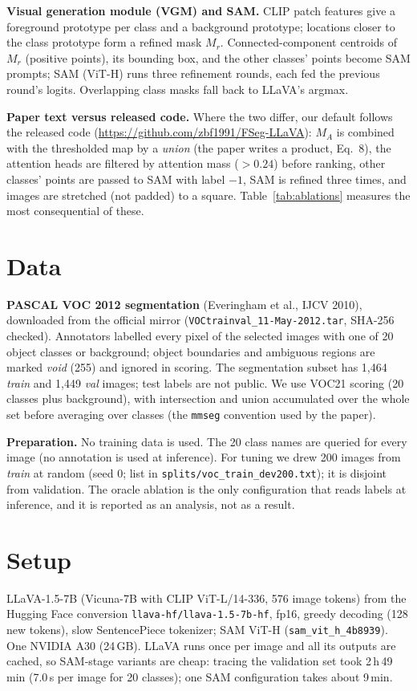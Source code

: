 \documentclass[10pt]{article}
\begin{document}
\textbf{Visual generation module (VGM) and SAM.} CLIP patch features give a foreground prototype per class and a
background prototype; locations closer to the class prototype form a refined mask $M_r$. Connected-component centroids
of $M_r$ (positive points), its bounding box, and the other classes' points become SAM prompts; SAM (ViT-H) runs three
refinement rounds, each fed the previous round's logits. Overlapping class masks fall back to LLaVA's argmax.

\textbf{Paper text versus released code.} Where the two differ, our default follows the released code
(\url{https://github.com/zbf1991/FSeg-LLaVA}): $M_A$ is combined with the thresholded map by a \emph{union} (the paper
writes a product, Eq.~8), the attention heads are filtered by attention mass ($>0.24$) before ranking, other classes'
points are passed to SAM with label $-1$, SAM is refined three times, and images are stretched (not padded) to a square.
Table~\ref{tab:ablations} measures the most consequential of these.

\section{Data}
\textbf{PASCAL VOC 2012 segmentation} (Everingham et al., IJCV 2010), downloaded from the official mirror
(\texttt{VOCtrainval\_11-May-2012.tar}, SHA-256 checked). Annotators labelled every pixel of the selected images with
one of 20 object classes or background; object boundaries and ambiguous regions are marked \emph{void} (255) and
ignored in scoring. The segmentation subset has 1{,}464 \emph{train} and 1{,}449 \emph{val} images; test labels are not
public. We use VOC21 scoring (20 classes plus background), with intersection and union accumulated over the whole set
before averaging over classes (the \texttt{mmseg} convention used by the paper).

\textbf{Preparation.} No training data is used. The 20 class names are queried for every image (no annotation is used
at inference). For tuning we drew 200 images from \emph{train} at random (seed 0; list in
\texttt{splits/voc\_train\_dev200.txt}); it is disjoint from validation. The oracle ablation is the only configuration
that reads labels at inference, and it is reported as an analysis, not as a result.

\section{Setup}
LLaVA-1.5-7B (Vicuna-7B with CLIP ViT-L/14-336, 576 image tokens) from the Hugging Face conversion
\texttt{llava-hf/llava-1.5-7b-hf}, fp16, greedy decoding (128 new tokens), slow SentencePiece tokenizer;
SAM ViT-H (\texttt{sam\_vit\_h\_4b8939}). One NVIDIA A30 (24\,GB). LLaVA runs once per image and all its outputs are
cached, so SAM-stage variants are cheap: tracing the validation set took 2\,h\,49\,min (7.0\,s per image for 20
classes); one SAM configuration takes about 9\,min.
\end{document}
